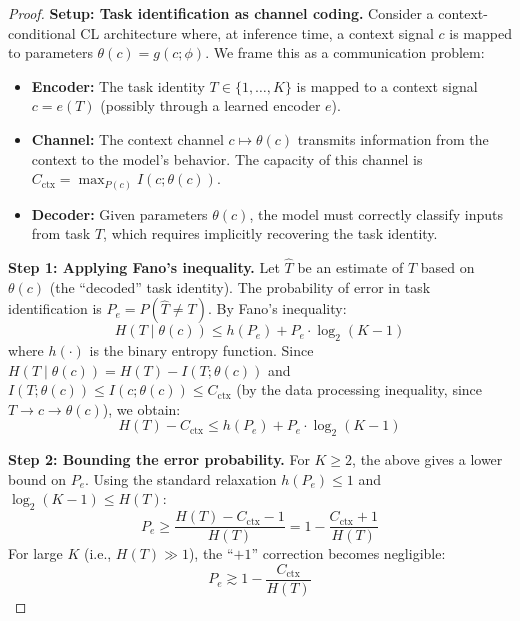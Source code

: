 \documentclass{article}
\begin{document}
\begin{proof}
\textbf{Setup: Task identification as channel coding.}
Consider a context-conditional CL architecture where, at inference time, a context signal $c$ is mapped to parameters $\theta(c) = g(c; \phi)$. We frame this as a communication problem:
\begin{itemize}
    \item \textbf{Encoder:} The task identity $T \in \{1, \ldots, K\}$ is mapped to a context signal $c = e(T)$ (possibly through a learned encoder $e$).
    \item \textbf{Channel:} The context channel $c \mapsto \theta(c)$ transmits information from the context to the model's behavior. The capacity of this channel is $C_\mathrm{ctx} = \max_{P(c)} I(c; \theta(c))$.
    \item \textbf{Decoder:} Given parameters $\theta(c)$, the model must correctly classify inputs from task $T$, which requires implicitly recovering the task identity.
\end{itemize}

\textbf{Step 1: Applying Fano's inequality.}
Let $\hat{T}$ be an estimate of $T$ based on $\theta(c)$ (the ``decoded'' task identity). The probability of error in task identification is $P_e = P(\hat{T} \neq T)$. By Fano's inequality:
\begin{equation}
    H(T \mid \theta(c)) \leq h(P_e) + P_e \cdot \log_2(K - 1)
\end{equation}
where $h(\cdot)$ is the binary entropy function. Since $H(T \mid \theta(c)) = H(T) - I(T; \theta(c))$ and $I(T; \theta(c)) \leq I(c; \theta(c)) \leq C_\mathrm{ctx}$ (by the data processing inequality, since $T \to c \to \theta(c)$), we obtain:
\begin{equation}
    H(T) - C_\mathrm{ctx} \leq h(P_e) + P_e \cdot \log_2(K - 1)
\end{equation}

\textbf{Step 2: Bounding the error probability.}
For $K \geq 2$, the above gives a lower bound on $P_e$. Using the standard relaxation $h(P_e) \leq 1$ and $\log_2(K-1) \leq H(T)$:
\begin{equation}
    P_e \geq \frac{H(T) - C_\mathrm{ctx} - 1}{H(T)} = 1 - \frac{C_\mathrm{ctx} + 1}{H(T)}
\end{equation}
For large $K$ (i.e., $H(T) \gg 1$), the ``$+1$'' correction becomes negligible:
\begin{equation}
    P_e \gtrsim 1 - \frac{C_\mathrm{ctx}}{H(T)}
\end{equation}


\end{proof}
\end{document}
